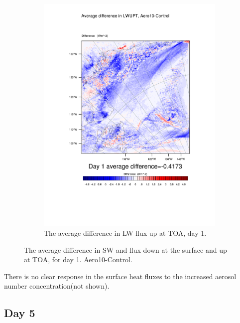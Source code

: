 \begin{figure}
\begin{subfigure}{0.48\textwidth}
		\includegraphics[width=\textwidth]{results/aero10/diff_Aero10_LWUPT_Day1.pdf}
		\caption{The average difference in LW flux up at TOA, day 1.}
		\label{subfig:lwup_r3Day1}
	\end{subfigure}
	\caption{The average difference in SW and flux down at the surface and up at TOA, for day 1. Aero10-Control.}
	\label{fig:radiation_r3Day1}
\end{figure}

There is no clear response in the surface heat fluxes to the increased aerosol number concentration(not shown).

\subsection{Day 5}

